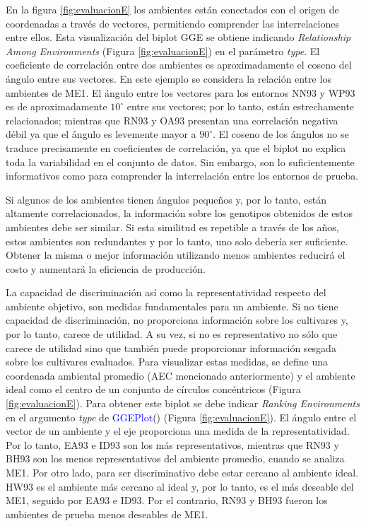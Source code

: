 En la figura \ref{fig:evaluacionE} los ambientes están conectados con el origen de coordenadas a través de vectores, permitiendo comprender las interrelaciones entre ellos.  Esta visualización del biplot GGE se obtiene indicando \emph{Relationship Among Environments} (Figura \ref{fig:evaluacionE}) en el parámetro \emph{type}. El coeficiente de correlación entre dos ambientes es aproximadamente el coseno del ángulo entre sus vectores. 
En este ejemplo se considera la relación entre los ambientes de ME1. El ángulo entre los vectores para los entornos NN93 y WP93 es de aproximadamente $10^{\circ}$ entre sus vectores; por lo tanto, están estrechamente relacionados; mientras que RN93 y OA93 presentan una correlación negativa débil ya que el ángulo es levemente mayor a $90^{\circ}$. El coseno de los ángulos no se traduce precisamente en coeficientes de correlación, ya que el biplot no explica toda la variabilidad en el conjunto de datos. Sin embargo, son lo suficientemente informativos como para comprender la interrelación entre los entornos de prueba. 

Si algunos de los ambientes tienen ángulos pequeños y, por lo tanto, están altamente correlacionados, la información sobre los genotipos obtenidos de estos ambientes debe ser similar. Si esta similitud es repetible a través de los años, estos ambientes son redundantes y por lo tanto, uno solo debería ser suficiente. Obtener la misma o mejor información utilizando menos ambientes reducirá el costo y aumentará la eficiencia de producción.


La capacidad de discriminación así como la representatividad respecto del ambiente objetivo, son medidas fundamentales para un ambiente. Si no tiene capacidad de discriminación, no proporciona información sobre los cultivares y, por lo tanto, carece de utilidad. A su vez, si no es representativo no sólo que carece de utilidad sino que también puede proporcionar información sesgada sobre los cultivares evaluados. Para visualizar estas medidas, se define una coordenada ambiental promedio (AEC mencionado anteriormente) y el ambiente ideal como el centro de un conjunto de círculos concéntricos (Figura \ref{fig:evaluacionE}). Para obtener este biplot se debe indicar \emph{Ranking Environments} en el argumento \emph{type} de \textcolor{blue}{GGEPlot}() (Figura \ref{fig:evaluacionE}). El ángulo entre el vector de un ambiente y el eje proporciona una medida de la representatividad. Por lo tanto, EA93 e ID93 son los más representativos, mientras que RN93 y BH93 son los menos representativos del ambiente promedio, cuando se analiza ME1. Por otro lado, para ser discriminativo debe estar cercano al ambiente ideal. HW93 es el ambiente más cercano al ideal y, por lo tanto, es el más deseable del ME1, seguido por EA93 e ID93. Por el contrario, RN93 y BH93 fueron los ambientes de prueba menos deseables de ME1. 

